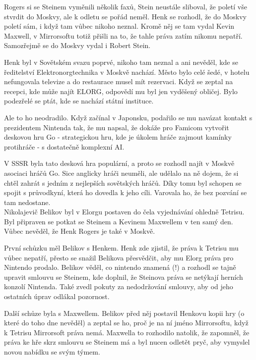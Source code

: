 \documentclass[12pt]{report}			%
\begin{document}
Rogers si se Steinem vyměnili několik faxů, Stein neustále sliboval, že poletí vše stvrdit do Moskvy, ale k odletu se pořád neměl. Henk se rozhodl, že do Moskvy poletí sám, i když tam vůbec nikoho neznal. Kromě něj se tam vydal Kevin Maxwell, v Mirrorsoftu totiž přišli na to, že tahle práva zatím nikomu nepatří. Samozřejmě se do Moskvy vydal i Robert Stein.\cite{Brown2016}

Henk byl v Sovětském svazu poprvé, nikoho tam neznal a ani nevěděl, kde se ředitelství Elektronorgtechnika v Moskvě nachází. Město bylo celé šedé, v hotelu nefungovala televize a do restaurace musel mít rezervaci. Když se zeptal na recepci, kde může najít ELORG, odpovědí mu byl jen vyděšený obličej. Bylo podezřelé se ptát, kde se nachází státní instituce. \cite{Ackerman2016}

Ale to ho neodradilo. Když začínal v Japonsku, podařilo se mu navázat kontakt s prezidentem Nintenda tak, že mu napsal, že dokáže pro Famicom vytvořit deskovou hru Go - strategickou hru, kde je úkolem hráče zajmout kamínky protihráče - s dostatečně komplexní AI. \cite{Ackerman2016}

V SSSR byla tato desková hra populární, a proto se rozhodl najít v Moskvě asociaci hráčů Go. Sice anglicky hráči neuměli, ale udělalo na ně dojem, že si chtěl zahrát s jedním z nejlepších sovětských hráčů. Díky tomu byl schopen se spojit s průvodkyní, která ho dovedla k jeho cíli. Varovala ho, že bez pozvání se tam nedostane.\cite{Ackerman2016}\\
Nikolajevič Belikov byl v Elorgu postaven do čela vyjednávání ohledně Tetrisu. Byl připraven se potkat se Steinem a Kevinem Maxwellem v ten samý den. Vůbec nevěděl, že Henk Rogers je také v Moskvě. \cite{Brown2016}

První schůzku měl Belikov s Henkem. Henk zde zjistil, že práva k Tetrisu mu vůbec nepatří, přesto se snažil Belikova přesvědčit, aby mu Elorg práva pro Nintendo prodalo. Belikov věděl, co nintendo znamená (!) a rozhodl se tajně upravit smlouvu se Steinem, kde doplnil, že Steinova práva se netýkají herních konzolí Nintenda. Také zvedl pokuty za nedodržování smlouvy, aby od jeho ostatních úprav odlákal pozornost. \cite{Brown2016}

Další schůze byla s Maxwellem. Belikov před něj postavil Henkovu kopii hry (o které do toho dne nevěděl) a zeptal se ho, proč je na ní jméno Mirrorsoftu, když k Tetrisu Mirrorsoft práva nemá. Maxwella to rozhodilo natolik, že zapomněl, že práva ke hře skrz smlouvu se Steinem má a byl nucen odletět pryč, aby vymyslel novou nabídku se svým týmem.\cite{Brown2016}
\end{document}
